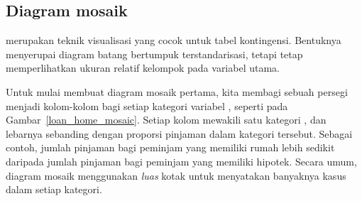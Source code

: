 
\subsection{Diagram mosaik}
\label{mosaic_plots_subsection}

 merupakan teknik visualisasi
yang cocok untuk tabel kontingensi. Bentuknya menyerupai
diagram batang bertumpuk terstandarisasi, tetapi tetap
memperlihatkan ukuran relatif kelompok pada variabel utama.

Untuk mulai membuat diagram mosaik pertama,
kita membagi sebuah persegi menjadi kolom-kolom bagi setiap kategori
variabel ,
seperti pada Gambar~\ref{loan_home_mosaic}.
Setiap kolom mewakili satu kategori ,
dan lebarnya sebanding dengan proporsi
pinjaman dalam kategori tersebut.
Sebagai contoh, jumlah pinjaman bagi peminjam
yang memiliki rumah lebih sedikit daripada jumlah pinjaman
bagi peminjam yang memiliki hipotek.
Secara umum, diagram mosaik menggunakan \emph{luas} kotak
untuk menyatakan banyaknya kasus dalam setiap kategori.

